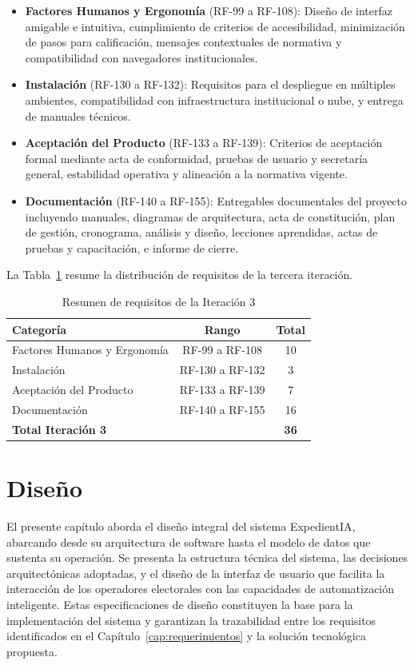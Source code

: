 \documentclass[12pt,a4paper,oneside]{book}
\begin{document}
\begin{itemize}
    \item \textbf{Factores Humanos y Ergonomía} (RF-99 a RF-108): Diseño de interfaz amigable e intuitiva, cumplimiento de criterios de accesibilidad, minimización de pasos para calificación, mensajes contextuales de normativa y compatibilidad con navegadores institucionales.
    \item \textbf{Instalación} (RF-130 a RF-132): Requisitos para el despliegue en múltiples ambientes, compatibilidad con infraestructura institucional o nube, y entrega de manuales técnicos.
    \item \textbf{Aceptación del Producto} (RF-133 a RF-139): Criterios de aceptación formal mediante acta de conformidad, pruebas de usuario y secretaría general, estabilidad operativa y alineación a la normativa vigente.
    \item \textbf{Documentación} (RF-140 a RF-155): Entregables documentales del proyecto incluyendo manuales, diagramas de arquitectura, acta de constitución, plan de gestión, cronograma, análisis y diseño, lecciones aprendidas, actas de pruebas y capacitación, e informe de cierre.
\end{itemize}

La Tabla~\ref{tab:iteracion3-resumen} resume la distribución de requisitos de la tercera iteración.

\begin{table}[H]
\centering
\caption{Resumen de requisitos de la Iteración 3}
\label{tab:iteracion3-resumen}
\begin{tabular}{@{}lcc@{}}
\toprule
\textbf{Categoría} & \textbf{Rango} & \textbf{Total} \\
\midrule
Factores Humanos y Ergonomía & RF-99 a RF-108 & 10 \\
Instalación & RF-130 a RF-132 & 3 \\
Aceptación del Producto & RF-133 a RF-139 & 7 \\
Documentación & RF-140 a RF-155 & 16 \\
\midrule
\textbf{Total Iteración 3} & & \textbf{36} \\
\bottomrule
\end{tabular}
\end{table}


\chapter{Diseño}
\label{cap:diseno}

El presente capítulo aborda el diseño integral del sistema ExpedientIA, abarcando desde su arquitectura de software hasta el modelo de datos que sustenta su operación. Se presenta la estructura técnica del sistema, las decisiones arquitectónicas adoptadas, y el diseño de la interfaz de usuario que facilita la interacción de los operadores electorales con las capacidades de automatización inteligente. Estas especificaciones de diseño constituyen la base para la implementación del sistema y garantizan la trazabilidad entre los requisitos identificados en el Capítulo~\ref{cap:requerimientos} y la solución tecnológica propuesta.
\end{document}
